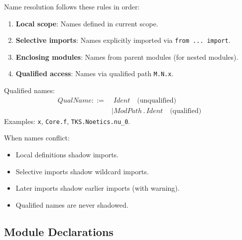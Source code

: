 \begin{definition}
\label{def:name-resolution}
Name resolution follows these rules in order:
\begin{enumerate}
  \item \textbf{Local scope}: Names defined in current scope.
  \item \textbf{Selective imports}: Names explicitly imported via \texttt{from ... import}.
  \item \textbf{Enclosing modules}: Names from parent modules (for nested modules).
  \item \textbf{Qualified access}: Names via qualified path \texttt{M.N.x}.
\end{enumerate}
\end{definition}

\begin{definition}
\label{def:qualified-name}
Qualified names:
\begin{align}
\mathit{QualName} ::=&\; \mathit{Ident} \quad \text{(unqualified)} \\
    &\mid \mathit{ModPath}\,.\,\mathit{Ident} \quad \text{(qualified)}
\end{align}
Examples: \texttt{x}, \texttt{Core.f}, \texttt{TKS.Noetics.nu\_0}.
\end{definition}

\begin{definition}
\label{def:shadowing}
When names conflict:
\begin{itemize}
  \item Local definitions shadow imports.
  \item Selective imports shadow wildcard imports.
  \item Later imports shadow earlier imports (with warning).
  \item Qualified names are never shadowed.
\end{itemize}
\end{definition}

\subsection{Module Declarations}
\label{subsec:module-decl-forms}

